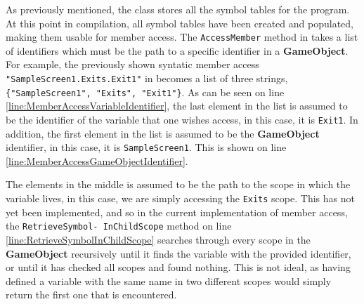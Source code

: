 As previously mentioned, the \abstractsemanticclass{} class stores all the symbol tables for the program. 
At this point in compilation, all symbol tables have been created and populated, making them usable for member access.
The \texttt{AccessMember} method in  takes a list of identifiers which must be the path to a specific identifier in a \textbf{GameObject}.
For example, the previously shown syntatic member access \texttt{"SampleScreen1.Exits.Exit1"} in  becomes a list of three strings, 
\texttt{\{"SampleScreen1", "Exits", "Exit1"\}}.
As can be seen on line \ref{line:MemberAccessVariableIdentifier}, the last element in the list is assumed to be the identifier of the variable that one wishes access, in this case, it is \texttt{Exit1}.
In addition, the first element in the list is assumed to be the \textbf{GameObject} identifier, in this case, it is \texttt{SampleScreen1}. 
This is shown on line \ref{line:MemberAccessGameObjectIdentifier}.

The elements in the middle is assumed to be the path to the scope in which the variable lives, in this case, we are simply accessing the \texttt{Exits} scope. 
This has not yet been implemented, and so in the current implementation of member access, the \texttt{RetrieveSymbol-
InChildScope} method on line \ref{line:RetrieveSymbolInChildScope} searches through every scope in the \textbf{GameObject} recursively until it finds the variable with the provided identifier, or until it has checked all scopes and found nothing. This is not ideal, as having defined a variable with the same name in two different scopes would simply return the first one that is encountered.